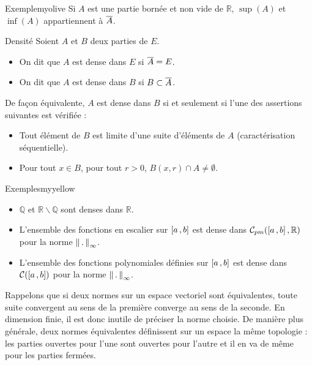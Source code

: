     \begin{omed}{Exemple}{myolive}
        Si $A$ est une partie bornée et non vide de $\mathbb{R}$, $\sup(A)$ et $\inf(A)$ appartiennent à $\overline{A}$.
    \end{omed}

    \begin{defi}{Densité}{}
        Soient $A$ et $B$ deux parties de $E$.
        \begin{itemize}
            \item On dit que $A$ est dense dans $E$ si $\overline{A} = E$.
            \item On dit que $A$ est dense dans $B$ si $B \subset \overline{A}$.
        \end{itemize}
    \end{defi}

    De façon équivalente, $A$ est dense dans $B$ si et seulement si l’une des assertions suivantes est vérifiée : 
    \begin{itemize}
        \item Tout élément de $B$ est limite d’une suite d’éléments de $A$ (caractérisation séquentielle).
        \item Pour tout $x \in B$, pour tout $r > 0$, $B(x,r) \cap A \neq \emptyset$.
    \end{itemize}

    \begin{omed}{Exemples}{myyellow}
        \begin{itemize}
            \item $\mathbb{Q}$ et $\mathbb{R} \backslash \mathbb{Q}$ sont denses dans $\mathbb{R}$.
            \item L’ensemble des fonctions en escalier sur $\left[ a \, , b \right]$ est dense dans $\mathcal{C}_{pm}(\left[ a \, , b \right],\mathbb{R})$ pour la norme $\left\lVert\,.\,\right\rVert_{\infty}$.
            \item L’ensemble des fonctions polynomiales définies sur $\left[ a \, , b \right]$ est dense dans $\mathcal{C}(\left[ a \, , b \right])$ pour la norme $\left\lVert\,.\,\right\rVert_{\infty}$.
        \end{itemize}
    \end{omed}

    Rappelons que si deux normes sur un espace vectoriel sont équivalentes, toute suite convergent au sens de la première converge au sens de la seconde. En dimension finie, il est donc inutile de préciser la norme choisie. De manière plus générale, deux normes équivalentes définissent sur un espace la même topologie : les parties ouvertes pour l’une sont ouvertes pour l’autre et il en va de même pour les parties fermées.

